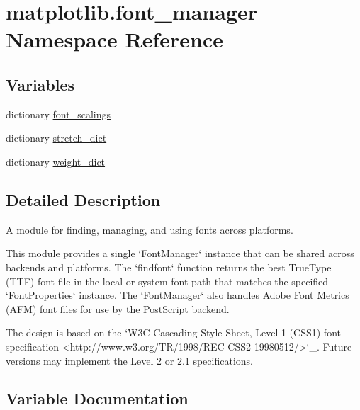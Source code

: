 \hypertarget{namespacematplotlib_1_1font__manager}{}\section{matplotlib.\+font\+\_\+manager Namespace Reference}
\label{namespacematplotlib_1_1font__manager}
\subsection*{Variables}
\begin{DoxyCompactItemize}
\item 
dictionary \hyperlink{namespacematplotlib_1_1font__manager_a3bc5c8e851abd8ee824b77aa137318ce}{font\+\_\+scalings}
\item 
dictionary \hyperlink{namespacematplotlib_1_1font__manager_a095ada35e9a066bd1b88db8e550f4bbd}{stretch\+\_\+dict}
\item 
dictionary \hyperlink{namespacematplotlib_1_1font__manager_a8d9baa8500646980b236908b262aa8a1}{weight\+\_\+dict}
\end{DoxyCompactItemize}


\subsection{Detailed Description}
\begin{DoxyVerb}A module for finding, managing, and using fonts across platforms.

This module provides a single `FontManager` instance that can
be shared across backends and platforms.  The `findfont`
function returns the best TrueType (TTF) font file in the local or
system font path that matches the specified `FontProperties`
instance.  The `FontManager` also handles Adobe Font Metrics
(AFM) font files for use by the PostScript backend.

The design is based on the `W3C Cascading Style Sheet, Level 1 (CSS1)
font specification <http://www.w3.org/TR/1998/REC-CSS2-19980512/>`_.
Future versions may implement the Level 2 or 2.1 specifications.
\end{DoxyVerb}
 

\subsection{Variable Documentation}
\mbox{\label{namespacematplotlib_1_1font__manager_a3bc5c8e851abd8ee824b77aa137318ce}} 
